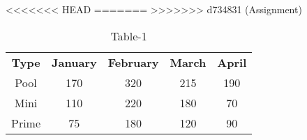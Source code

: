 \begin{table}[htbp]
\centering
  \caption{Table-1}
<<<<<<< HEAD
  \label{tabl:tables/table1.tex}
=======
  \label{table1}
>>>>>>> d734831 (Assignment)
  \begin{tabular}{c|cccc}
\textbf{Type} & \textbf{January} & \textbf{February} & \textbf{March} & \textbf{April} \\
Pool & 170 & 320 & 215 & 190 \\
Mini & 110 & 220 & 180 & 70 \\
Prime & 75 & 180 & 120 & 90 \\
  \end{tabular}
\end{table}

